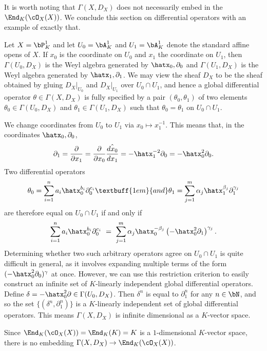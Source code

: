 It is worth noting that $\Gamma(X,D_X)$ does not necessarily embed in the $\End_K(\cO_X(X))$. We conclude this section on differential operators with an example of exactly that.
\begin{example}\label{example:diff-op-on-proj}
	Let $X = \bP^1_K$ and let $U_0 = \bA^1_K$ and $U_1 = \bA^1_K$ denote the standard affine opens of $X$. If $x_0$ is the coordinate on $U_0$ and $x_1$ the coordinate on $U_1$, then $\Gamma(U_0,D_X)$ is the Weyl algebra generated by $\hatx_0,\partial_0$ and $\Gamma(U_1,D_X)$ is the Weyl algebra generated by $\hatx_1,\partial_1$. We may view the sheaf $D_X$ to be the sheaf obtained by gluing $D_X|_{U_0}$ and $D_X|_{U_1}$ over $U_0\cap U_1$, and hence a global differential operator $\theta \in \Gamma(X,D_X)$ is fully specified by a pair $(\theta_0,\theta_1)$ of two elements $\theta_0 \in \Gamma(U_0, D_X)$ and $\theta_1 \in \Gamma(U_1,D_X)$ such that $\theta_0 = \theta_1$ on $U_0\cap U_1$.

	We change coordinates from $U_0$ to $U_1$ via $x_0 \mapsto x_1^{-1}$. This means that, in the coordinates $\hatx_0,\partial_0$,
	\begin{align*}
		\partial_1 = \frac{\partial}{\partial x_1} = \frac{\partial}{\partial x_0}\hat{\frac{dx_0}{dx_1}} = -\hatx_1^{-2}\partial_0 = -\hatx_0^2\partial_0.
	\end{align*}
	Two differential operators
	\begin{align*}
		\theta_0 = \sum_{i=1}^n a_i\hatx_0^{b_i} \partial_0^{c_i} \textbuff{1em}{and} \theta_1 = \sum_{j=1}^m \alpha_j\hatx_1^{\beta_j} \partial_1^{\gamma_j}
	\end{align*}
	are therefore equal on $U_0\cap U_1$ if and only if
	\begin{align*}
		\sum_{i=1}^n a_i\hatx_0^{b_i} \partial_0^{c_i} ~=~ \sum_{j=1}^m \alpha_j\hatx_0^{-\beta_j} \left(-\hatx_0^2\partial_1\right)^{\gamma_j}.
	\end{align*}
	Determining whether two such arbitrary operators agree on $U_0\cap U_1$ is quite difficult in general, as it involves expanding multiple terms of the form $(-\hatx_0^2\partial_0)^{\gamma}$ at once. However, we can use this restriction criterion to easily construct an infinite set of $K$-linearly independent global differential operators. Define $\delta = -\hatx_0^2\partial \in \Gamma(U_0,D_X)$. Then $\delta^n$ is equal to $\partial_1^n$ for any $n \in \bN$, and so the set $\{(\delta^n,\partial_1^n)\}$ is a $K$-linearly independent set of global differential operators. This means $\Gamma(X,D_X)$ is infinite dimensional as a $K$-vector space.

	Since $\End_K(\cO_X(X)) = \End_K(K) = K$ is a $1$-dimensional $K$-vector space, there is no embedding $\Gamma(X,D_X) \to \End_K(\cO_X(X))$.
\end{example}

